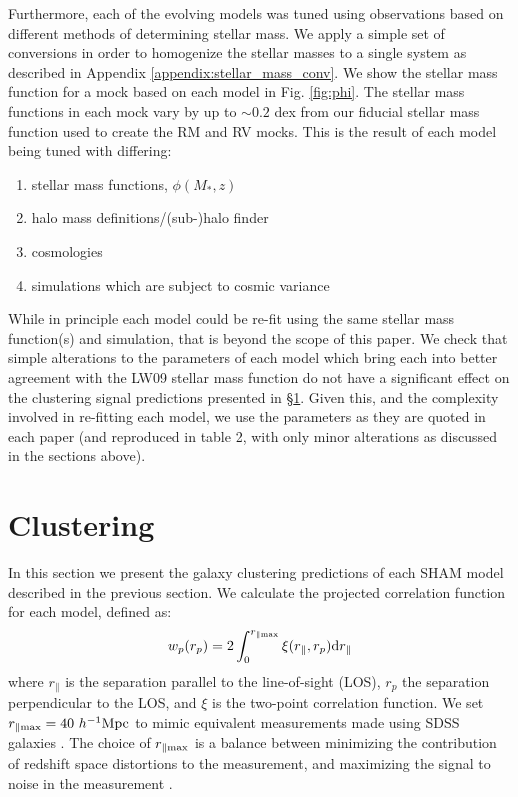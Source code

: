\documentclass[useAMS,fleqn,usenatbib]{mnras}
\begin{document}
Furthermore, each of the evolving models was tuned using observations based on different methods of determining stellar mass.  We apply a simple set of conversions in order to homogenize the stellar masses to a single system as described in Appendix \ref{appendix:stellar_mass_conv}.   We show the stellar mass function for a mock based on each model in Fig. \ref{fig:phi}.  The stellar mass functions in each mock vary by up to $\sim 0.2$ dex from our fiducial stellar mass function used to create the RM and RV mocks.  This is the result of each model being tuned with differing:
\begin{enumerate}
\item stellar mass functions, $\phi(M_*,z)$
\item halo mass definitions/(sub-)halo finder
\item cosmologies
\item simulations which are subject to cosmic variance
\end{enumerate}
While in principle each model could be re-fit using the same stellar mass function(s) and simulation, that is beyond the scope of this paper.  We check that simple alterations to the parameters of each model which bring each into better agreement with the LW09 stellar mass function do not have a significant effect on the clustering signal predictions presented in \S \ref{sec:clustering}.  Given this, and the complexity involved in re-fitting each model, we use the parameters as they are quoted in each paper (and reproduced in table 2, with only minor alterations as discussed in the sections above).  


\section{Clustering}
\label{sec:clustering}

In this section we present the galaxy clustering predictions of each SHAM model described in the previous section.  We calculate the projected correlation function for each model, defined as:
%
\begin{equation}
w_p(r_p) = 2\int_0^{r_{\parallel \rm max}}\xi(r_{\parallel},r_p)\mathrm{d}r_{\parallel}
\end{equation}
%
where $r_{\parallel}$ is the separation parallel to the line-of-sight (LOS), $r_{p}$ the separation perpendicular to the LOS, and $\xi$ is the two-point correlation function.  We set $r_{\parallel \rm max} = 40~{h^{-1}\rm Mpc}$ to mimic equivalent measurements made using SDSS galaxies \citep{Yang:2012ew}.  The choice of $r_{\parallel \rm max}$ is a balance between minimizing the contribution of redshift space distortions to the measurement, and maximizing the signal to noise in the measurement \citep{Padmanabhan:2007kn, vandenBosch:2013jf}.
\end{document}
